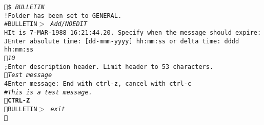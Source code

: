  {\smaller \tt  \$ {\it BULLETIN}\CR \\[.5em] ! Folder has been set to GENERAL.\\ # BULLETIN$>$ {\it Add/NOEDIT} \CR \\ H It is  7-MAR-1988 16:21:44.20. Specify when the message should expire:\\J Enter absolute time: [dd-mmm-yyyy] hh:mm:ss or delta time: dddd hh:mm:ss\\ {\it 10}\CR \\; Enter description header.  Limit header to 53 characters.\\  {\it Test message}\CR \\4 Enter message: End with ctrl-z, cancel with ctrl-c\\# {\it This is a test message.}\CR \\  {\bf CTRL-Z }\\  BULLETIN$>$ {\it exit}\CR \\ } 
